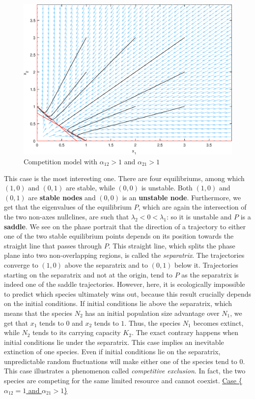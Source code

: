 \documentclass[11pt,a4paper]{scrartcl}
\theoremstyle{definition}
\begin{document}
\begin{figure}[!ht]
\centering
\includegraphics[scale=.6]{fig_4.eps}
\caption{Competition model with $\alpha_{12} > 1$ and $\alpha_{21} > 1$}
\label{figC4}
\end{figure} 

This case is the most interesting one. There are four equilibriums, among which $(1, 0)$ and $(0, 1)$ are stable, while $(0, 0)$ is unstable. Both $(1, 0)$ and $(0, 1)$ are \textbf{stable nodes} and $(0, 0)$ is an \textbf{unstable node}. Furthermore, we get that the eigenvalues of the equilibrium $P$, which are again the intersection of the two non-axes nullclines, are such that $\lambda_2<0<\lambda_1$: so it is unstable and $P$ is a \textbf{saddle}. We see on the phase portrait that the direction of a trajectory to either one of the two stable equilibrium points depends on its position towards the straight line that passes through $P$. This straight line, which splits the phase plane into two non-overlapping regions, is called the \textit{separatrix}. The trajectories converge to $(1, 0)$ above the separatrix and to $(0, 1)$ below it. Trajectories starting on the separatrix and not at the origin, tend to $P$ as the separatrix is indeed one of the saddle trajectories. However, here, it is ecologically impossible to predict which species ultimately wins out, because this result crucially depends on the initial conditions. If initial conditions lie above the separatrix, which means that the species $N_2$ has an initial population size advantage over $N_1$, we get that $x_1$ tends to $0$ and $x_2$ tends to $1$. Thus, the species $N_1$ becomes extinct, while $N_2$ tends to its carrying capacity $K_2$. The exact contrary happens when initial conditions lie under the separatrix. This case implies an inevitable extinction of one species. Even if initial conditions lie on the separatrix, unpredictable random fluctuations will make either one of the species tend to $0$. This case illustrates a phenomenon called \textit{competitive exclusion}. In fact, the two species are competing for the same limited resource and cannot coexist.
\FloatBarrier
\vspace{1em}
\underline{Case \Big\{$\alpha_{12} = 1$ and $\alpha_{21} > 1$\Big\}}\newline
\end{document}
